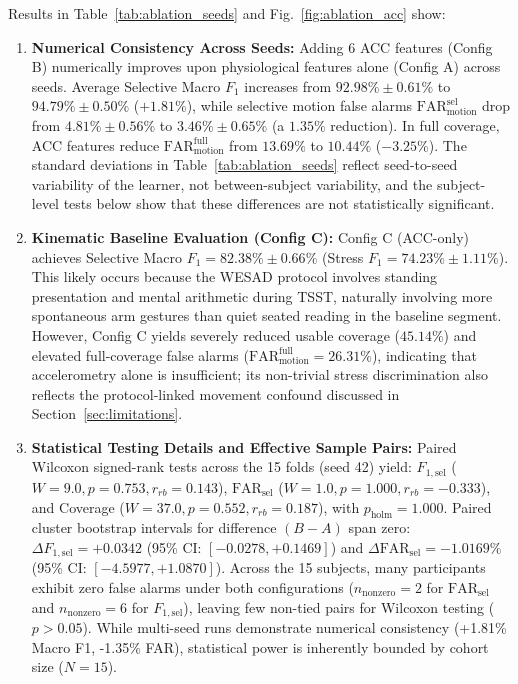 \documentclass[conference]{IEEEtran}
\begin{document}
Results in Table~\ref{tab:ablation_seeds} and Fig.~\ref{fig:ablation_acc} show:
\begin{enumerate}
    \item \textbf{Numerical Consistency Across Seeds:} Adding 6 ACC features (Config B) numerically improves upon physiological features alone (Config A) across seeds. Average Selective Macro $F_1$ increases from $92.98\% \pm 0.61\%$ to $94.79\% \pm 0.50\%$ ($+1.81\%$), while selective motion false alarms $\text{FAR}_{\text{motion}}^{\text{sel}}$ drop from $4.81\% \pm 0.56\%$ to $3.46\% \pm 0.65\%$ (a $1.35\%$ reduction). In full coverage, ACC features reduce $\text{FAR}_{\text{motion}}^{\text{full}}$ from $13.69\%$ to $10.44\%$ ($-3.25\%$). The standard deviations in Table~\ref{tab:ablation_seeds} reflect seed-to-seed variability of the learner, not between-subject variability, and the subject-level tests below show that these differences are not statistically significant.
    \item \textbf{Kinematic Baseline Evaluation (Config C):} Config C (ACC-only) achieves Selective Macro $F_1 = 82.38\% \pm 0.66\%$ (Stress $F_1 = 74.23\% \pm 1.11\%$). This likely occurs because the WESAD protocol involves standing presentation and mental arithmetic during TSST, naturally involving more spontaneous arm gestures than quiet seated reading in the baseline segment. However, Config C yields severely reduced usable coverage ($45.14\%$) and elevated full-coverage false alarms ($\text{FAR}_{\text{motion}}^{\text{full}} = 26.31\%$), indicating that accelerometry alone is insufficient; its non-trivial stress discrimination also reflects the protocol-linked movement confound discussed in Section~\ref{sec:limitations}.
    \item \textbf{Statistical Testing Details and Effective Sample Pairs:} Paired Wilcoxon signed-rank tests across the 15 folds (seed 42) yield: $F_{1,\text{sel}}$ ($W = 9.0, p = 0.753, r_{rb} = 0.143$), $\text{FAR}_{\text{sel}}$ ($W = 1.0, p = 1.000, r_{rb} = -0.333$), and Coverage ($W = 37.0, p = 0.552, r_{rb} = 0.187$), with $p_{\text{holm}} = 1.000$. Paired cluster bootstrap intervals for difference $(B - A)$ span zero: $\Delta F_{1,\text{sel}} = +0.0342$ (95\% CI: $[-0.0278, +0.1469]$) and $\Delta \text{FAR}_{\text{sel}} = -1.0169\%$ (95\% CI: $[-4.5977, +1.0870]$). Across the 15 subjects, many participants exhibit zero false alarms under both configurations ($n_{\text{nonzero}} = 2$ for $\text{FAR}_{\text{sel}}$ and $n_{\text{nonzero}} = 6$ for $F_{1,\text{sel}}$), leaving few non-tied pairs for Wilcoxon testing ($p > 0.05$). While multi-seed runs demonstrate numerical consistency (+1.81\% Macro F1, -1.35\% FAR), statistical power is inherently bounded by cohort size ($N=15$).
\end{enumerate}
\end{document}
